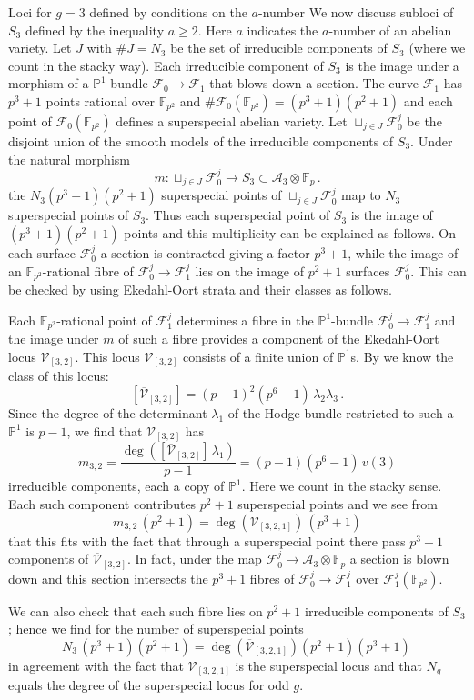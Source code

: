 \documentclass[11pt]{amsart}
\numberwithin{equation}{section}
\newcommand{\FF}{\mathbb F}
\newcommand{\PP}{\mathbb P}
\theoremstyle{definition}
\theoremstyle{remark}
\begin{document}
\begin{section}{Loci for $g=3$ defined by conditions on the $a$-number}
We now discuss subloci of $S_3$ defined by the inequality $a\geq 2$. Here $a$ indicates the $a$-number
of an abelian variety.
Let $J$ with $\# J=N_3$ be the set of irreducible components of $S_3$ (where we count in the stacky way).
Each irreducible component of $S_3$ is the image under a morphism of a ${\PP}^1$-bundle
$\mathcal{F}_0 \to \mathcal{F}_1$ that blows down a section.
The curve $\mathcal{F}_1$ has $p^3+1$ points rational over ${\FF}_{p^2}$
and $\# \mathcal{F}_0({\FF}_{p^2})=(p^3+1)(p^2+1)$ and each
point of $\mathcal{F}_0({\FF}_{p^2})$ defines a superspecial
abelian variety. Let $\sqcup_{j \in J} \mathcal{F}_0^{j}$ be the
disjoint union of the smooth models of the irreducible components of $S_3$.
Under the natural morphism 
$$
m: \sqcup_{j \in J} \mathcal{F}_0^{j}\longrightarrow S_3 \subset 
\mathcal{A}_3 \otimes{\FF}_p\, .
$$
the $N_3(p^3+1)(p^2+1)$ superspecial points of $\sqcup_{j \in J} \mathcal{F}_0^{j}$
map to $N_3$ superspecial points of $S_3$.
Thus each superspecial point of $S_3$ is the image of
$(p^3+1)(p^2+1)$ points and this multiplicity can be explained as follows. On each surface $\mathcal{F}_0^j$
a section is contracted giving a factor $p^3+1$, while
the image of an ${\FF}_{p^2}$-rational fibre of $\mathcal{F}_0^j \to \mathcal{F}_1^j$ lies
on the image of 
$p^2+1$ surfaces $\mathcal{F}_0^j$. This can be checked by using Ekedahl-Oort strata and their classes 
as follows.  

Each ${\FF}_{p^2}$-rational point of $\mathcal{F}_1^j$ determines a fibre in the ${\PP}^1$-bundle 
$\mathcal{F}_0^j\to \mathcal{F}_1^j$ and the image under $m$ of such a fibre
provides a component of the Ekedahl-Oort locus $\mathcal{V}_{[3,2]}$.
This locus  $\mathcal{V}_{[3,2]}$ consists of a finite union of ${\PP}^1$s.
By \cite{E-vdG} we know the class of this locus:
$$
[\overline{\mathcal{V}}_{[3,2]}]=(p-1)^2(p^6-1) \, \lambda_2\lambda_3\, .
$$
Since the degree of the determinant $\lambda_1$ of the Hodge bundle
restricted to such a ${\PP}^1$ is $p-1$, we find that $\overline{\mathcal{V}}_{[3,2]}$
has
$$
m_{3,2}=\frac{\deg( [\overline{\mathcal{V}}_{[3,2]}]\, \lambda_1)}{p-1}=
(p-1)(p^6-1) \, v(3)
$$
irreducible components, each a copy of ${\PP}^1$. 
Here we count in the stacky sense.
Each such component contributes $p^2+1$ superspecial points and we see from
$$
m_{3,2} \, (p^2+1) = \deg(\overline{\mathcal{V}}_{[3,2,1]}) \, (p^3+1)
$$
that this fits with the fact that through a superspecial point there
pass $p^3+1$ components of $\overline{\mathcal{V}}_{[3,2]}$.
In fact, under the map $\mathcal{F}_0^j \to \mathcal{A}_3\otimes {\FF}_p$ a section is blown down
and this section intersects the $p^3+1$ fibres of $\mathcal{F}_0^j\to \mathcal{F}_1^j$ over
$\mathcal{F}_1^j({\FF}_{p^2})$.

We can also check that each such fibre lies on
$p^2+1$ irreducible components of $S_3$; hence we find for the number of
superspecial points
$$
N_3 \,  (p^3+1)(p^2+1) =
\deg({\overline{\mathcal{V}}_{[3,2,1]}}) (p^2+1)(p^3+1)\,
$$
in agreement with the fact that $\mathcal{V}_{[3,2,1]}$
is the superspecial locus and that
$N_g$ equals the degree of the superspecial locus for odd $g$.
\end{section}
\end{document}
